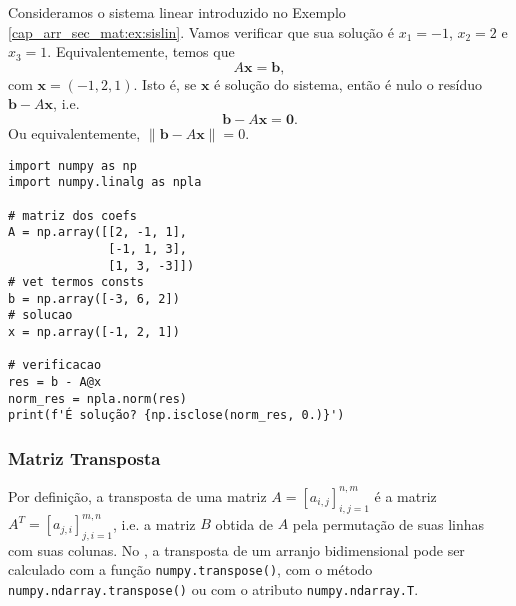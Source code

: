 \begin{ex}
  Consideramos o sistema linear introduzido no Exemplo \ref{cap_arr_sec_mat:ex:sislin}. Vamos verificar que sua solução é $x_1 = -1$, $x_2 = 2$ e $x_3 = 1$. Equivalentemente, temos que
  \begin{equation}
    A\pmb{x} = \pmb{b},
  \end{equation}
  com $\pmb{x} = (-1, 2, 1)$. Isto é, se $\pmb{x}$ é solução do sistema, então é nulo o resíduo $\pmb{b} - A\pmb{x}$, i.e.
  \begin{equation}
    \pmb{b} - A\pmb{x} = \pmb{0}.
  \end{equation}
  Ou equivalentemente, $\|\pmb{b} - A\pmb{x}\| = 0$.

\begin{lstlisting}
import numpy as np
import numpy.linalg as npla

# matriz dos coefs
A = np.array([[2, -1, 1],
              [-1, 1, 3],
              [1, 3, -3]])
# vet termos consts
b = np.array([-3, 6, 2])
# solucao
x = np.array([-1, 2, 1])

# verificacao
res = b - A@x
norm_res = npla.norm(res)
print(f'É solução? {np.isclose(norm_res, 0.)}')
\end{lstlisting}
\end{ex}

\subsubsection{Matriz Transposta}

Por definição, a transposta de uma matriz $A = [a_{i,j}]_{i,j=1}^{n,m}$ é a matriz $A^T = [a_{j,i}]_{j,i=1}^{m,n}$, i.e. a matriz $B$ obtida de $A$ pela permutação de suas linhas com suas colunas. No {\numpy}, a transposta de um arranjo bidimensional pode ser calculado com a função \lstinline+numpy.transpose()+, com o método \lstinline+numpy.ndarray.transpose()+ ou com o atributo \lstinline+numpy.ndarray.T+.

